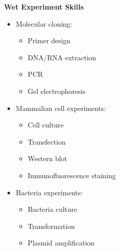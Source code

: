 \textbf{Wet Experiment Skills}
\vspace{-1em}
\begin{multicols}{3}
\begin{itemize}
    \item Molecular cloning:
    \begin{itemize}
        \item Primer design
        \item DNA/RNA extraction
        \item PCR
        \item Gel electrophoresis
    \end{itemize}
\end{itemize}  
  
\columnbreak %

\begin{minipage}[t]{0.35\textwidth} %
    \begin{itemize} 
        \item Mammalian cell experiments:
        \begin{itemize}
            \item Cell culture
            \item Transfection
            \item Western blot
            \item Immunofluorescence staining
        \end{itemize}
    \end{itemize}
\end{minipage}  


\columnbreak %
  
\begin{itemize} 
    \item Bacteria experiments:
    \begin{itemize}
        \item Bacteria culture
        \item Transformation
        \item Plasmid amplification
    \end{itemize}
\end{itemize}  
\end{multicols}
